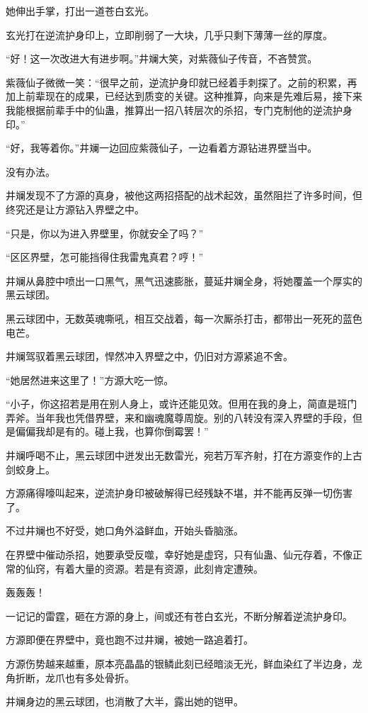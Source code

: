 \begin{this_body}
她伸出手掌，打出一道苍白玄光。

玄光打在逆流护身印上，立即削弱了一大块，几乎只剩下薄薄一丝的厚度。

“好！这一次改进大有进步啊。”井斓大笑，对紫薇仙子传音，不吝赞赏。

紫薇仙子微微一笑：“很早之前，逆流护身印就已经着手刺探了。之前的积累，再加上前辈现在的成果，已经达到质变的关键。这种推算，向来是先难后易，接下来我能根据前辈手中的仙蛊，推算出一招八转层次的杀招，专门克制他的逆流护身印。”

“好，我等着你。”井斓一边回应紫薇仙子，一边看着方源钻进界壁当中。

没有办法。

井斓发现不了方源的真身，被他这两招搭配的战术起效，虽然阻拦了许多时间，但终究还是让方源钻入界壁之中。

“只是，你以为进入界壁里，你就安全了吗？”

“区区界壁，怎可能挡得住我雷鬼真君？哼！”

井斓从鼻腔中喷出一口黑气，黑气迅速膨胀，蔓延井斓全身，将她覆盖一个厚实的黑云球团。

黑云球团中，无数英魂嘶吼，相互交战着，每一次厮杀打击，都带出一死死的蓝色电芒。

井斓驾驭着黑云球团，悍然冲入界壁之中，仍旧对方源紧追不舍。

“她居然进来这里了！”方源大吃一惊。

“小子，你这招若是用在别人身上，或许还能见效。但用在我的身上，简直是班门弄斧。当年我也凭借界壁，来和幽魂魔尊周旋。别的八转没有深入界壁的手段，但是偏偏我却是有的。碰上我，也算你倒霉罢！”

井斓呼喝不止，黑云球团中迸发出无数雷光，宛若万军齐射，打在方源变作的上古剑蛟身上。

方源痛得嚎叫起来，逆流护身印被破解得已经残缺不堪，并不能再反弹一切伤害了。

不过井斓也不好受，她口角外溢鲜血，开始头昏脑涨。

在界壁中催动杀招，她要承受反噬，幸好她是虚窍，只有仙蛊、仙元存着，不像正常的仙窍，有着大量的资源。若是有资源，此刻肯定遭殃。

轰轰轰！

一记记的雷霆，砸在方源的身上，间或还有苍白玄光，不断分解着逆流护身印。

方源即便在界壁中，竟也跑不过井斓，被她一路追着打。

方源伤势越来越重，原本亮晶晶的银鳞此刻已经暗淡无光，鲜血染红了半边身，龙角折断，龙爪也有多处骨折。

井斓身边的黑云球团，也消散了大半，露出她的铠甲。


\end{this_body}
